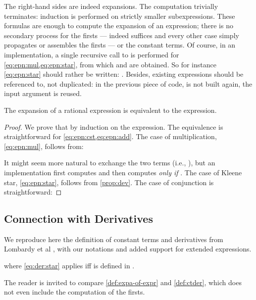 \documentclass[a4paper,USenglish]{lipics}
\begin{document}
The right-hand sides are indeed expansions.  The computation trivially
terminates: induction is performed on strictly smaller subexpressions.
These formulas are enough to compute the expansion of an expression; there
is no secondary process for the firsts --- indeed
 suffices and every other case
simply propagates or assembles the firsts --- or the constant terms.  Of
course, in an implementation, a single recursive call to  is
performed for \cref{eq:epn:mul,eq:epn:star}, from which  and
 are obtained.  So for instance \cref{eq:epn:star} should rather
be written:
.  Besides, existing expressions should be referenced to, not
duplicated: in the previous piece of code,  is not built again, the
input argument is reused.

\begin{Proposition}
  The expansion of a rational expression is equivalent to the expression.
\end{Proposition}
\begin{proof}
  We prove that  by induction on the expression.
  The equivalence is straightforward for
  \cref{eq:epn:cst,eq:epn:add}.
The case of multiplication, \cref{eq:epn:mul}, follows from:
  
  It might seem more natural to exchange the two terms (i.e.,
  ), but an
  implementation first computes  and then computes 
  \emph{only if} .
The case of Kleene star, \cref{eq:epn:star}, follows from \cref{prop:dev}.
  The case of conjunction is straightforward:
\end{proof}


\subsection{Connection with Derivatives}

We reproduce here the definition of constant terms and derivatives from
Lombardy et al \citep[p.~148 and Def.~2]{lombardy.2005.tcs}, with our
notations and added support for extended expressions.

\begin{Definition}
  \label{def:ctder}
  
  where \cref{eq:der:star} applies iff  is defined in .
\end{Definition}

The reader is invited to compare \cref{def:expa-of-expr} and
\cref{def:ctder}, which does not even include the computation of the firsts.
\end{document}
